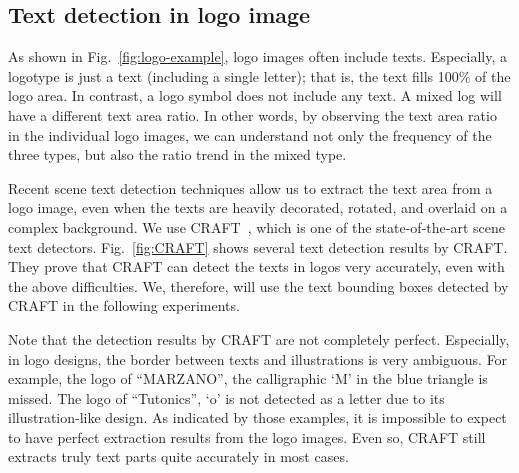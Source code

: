 \documentclass[runningheads]{llncs}
\begin{document}
\subsection{Text detection in logo image}
As shown in Fig.~\ref{fig:logo-example}, logo images often include texts. Especially, a logotype is just a text (including a single letter); that is, the text fills 100\% of the logo area. In contrast, a logo symbol does not include any text. A mixed log will have a different text area ratio. In other words, by observing the text area ratio in the individual logo images, we can understand not only the frequency of the three types, but also the ratio trend in the mixed type.\par
%
Recent scene text detection techniques allow us to extract the text area from a logo image, even when the texts are heavily decorated, rotated, and overlaid on a complex background. We use CRAFT~\cite{baek2019character}, which is one of the state-of-the-art scene text detectors. Fig.~\ref{fig:CRAFT} shows several text detection results by CRAFT. They prove that CRAFT can detect the texts in logos very accurately, even with the above difficulties. We, therefore, will use the text bounding boxes detected by CRAFT in the following experiments.\par
%
Note that the detection results by CRAFT are not completely perfect. Especially, in logo designs, the border between texts and illustrations is very ambiguous. For example, the logo of ``MARZANO'', the calligraphic `M' in the blue triangle is missed. The logo of ``Tutonics'', `o' is not detected as a letter due to its illustration-like design. As indicated by those examples, it is impossible to expect to have perfect extraction results from the logo images. Even so, CRAFT still extracts truly text parts quite accurately in most cases.

\end{document}
